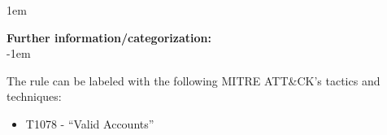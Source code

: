 \openup 1em

{\bf Further information/categorization:} \\

\openup -1em
\vspace{-2em}


The rule can be labeled with the following MITRE ATT\&CK's tactics and techniques:
\begin{itemize}
	\item T1078 - ``Valid Accounts''
\end{itemize}

\pagebreak

